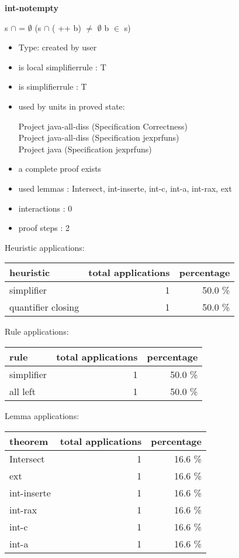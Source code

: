 \documentclass[a4paper]{article}
\begin{document}
{\LARGE\bf int-notempty}\label{lemma-int-notempty}

\medskip

 \Fol s $\cap$  = $\emptyset$ \Imp (s $\cap$ ( ++ b) $\neq$ $\emptyset$ \Equiv b $\in$ s)

\begin{itemize}

\item Type: created by user

\item is local simplifierrule : T
\item is simplifierrule : T
\item used by units in proved state:

Project java-all-diss (Specification Correctness) \\
Project java-all-diss (Specification jexprfuns) \\
Project java (Specification jexprfuns)
\item       a complete proof exists
\item       used lemmas  : Intersect, int-inserte, int-c, int-a, int-rax, ext
\item       interactions : 0
\item       proof steps  : 2
\end{itemize}

\medskip


Heuristic applications:

\begin{supertabular}{l|r|r}
heuristic	& total applications & percentage \\ \hline
simplifier & 1 & 50.0 \% \\
quantifier closing & 1 & 50.0 \% \\

\end{supertabular}

Rule applications:

\begin{supertabular}{l|r|r}
rule	        & total applications & percentage \\ \hline
simplifier & 1 & 50.0 \% \\
all left & 1 & 50.0 \% \\

\end{supertabular}

Lemma applications:

\begin{supertabular}{l|r|r}
theorem	        & total applications & percentage \\ \hline
Intersect & 1 & 16.6 \% \\
ext & 1 & 16.6 \% \\
int-inserte & 1 & 16.6 \% \\
int-rax & 1 & 16.6 \% \\
int-c & 1 & 16.6 \% \\
int-a & 1 & 16.6 \% \\

\end{supertabular}
\pagebreak
\end{document}
